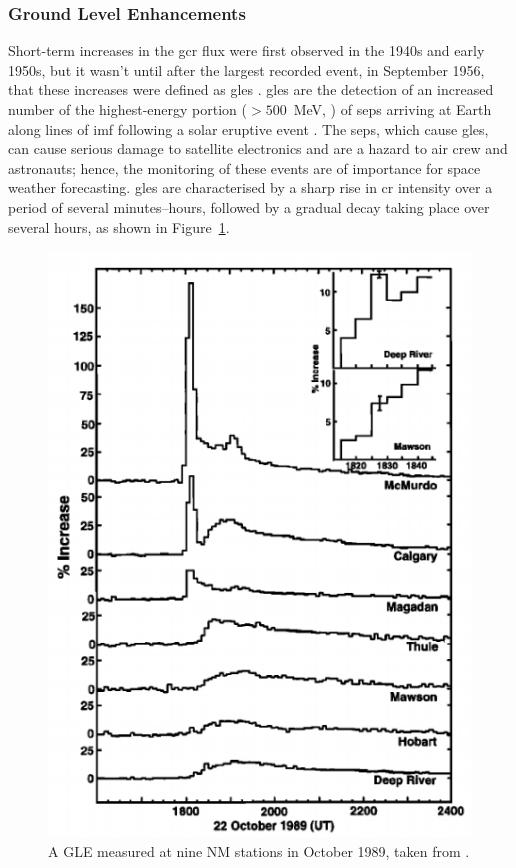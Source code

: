 \subsubsection*{Ground Level Enhancements}\label{sec:intro_GLEs}

Short-term increases in the \gls{gcr} flux were first observed in the 1940s and early 1950s, but it wasn't until after the largest recorded event, in September 1956, that these increases were defined as \glspl{gle} \citep{cramp_modelling_1996}. \glspl{gle} are the detection of an increased number of the highest-energy portion ($> 500$~MeV, \citet{kuwabara_development_2006}) of \glspl{sep} arriving at Earth along lines of \gls{imf} following a solar eruptive event \citep{mccracken_high-energy_2012, poluianov_revisited_2017}. The \glspl{sep}, which cause \glspl{gle}, can cause serious damage to satellite electronics and are a hazard to air crew and astronauts; hence, the monitoring of these events are of importance for space weather forecasting. \glspl{gle} are characterised by a sharp rise in \gls{cr} intensity over a period of several minutes--hours, followed by a gradual decay taking place over several hours, as shown in Figure~\ref{fig:GLE_plot}. 

\begin{figure}[ht!]
	\centering
	\includegraphics[width=0.75\columnwidth]{GLE_plot.png}
	\caption{A GLE measured at nine NM stations in October 1989, taken from \citet{cramp_j._l._october_1997}.}
	\label{fig:GLE_plot}
\end{figure}


